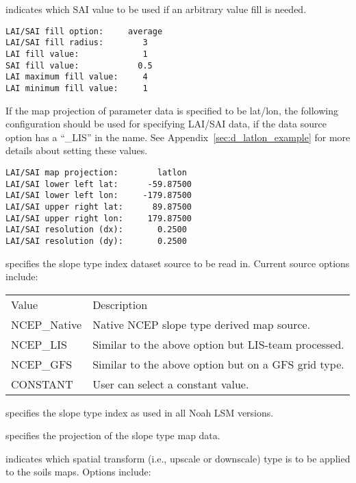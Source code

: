   indicates which SAI
 value to be used if an arbitrary value fill is needed. 
 \nextpar
 

 \begin{Verbatim}[frame=single]
LAI/SAI fill option:     average
LAI/SAI fill radius:        3 
LAI fill value:             1
SAI fill value:            0.5
LAI maximum fill value:     4
LAI minimum fill value:     1
 \end{Verbatim}

 
 If the map projection of parameter data is specified to be lat/lon, 
 the following configuration should be used for specifying LAI/SAI data,
 if  the data source option has a ``\_LIS'' in the name.
 See Appendix~\ref{sec:d_latlon_example} for more details about
 setting these values.
 

 \begin{Verbatim}[frame=single]
LAI/SAI map projection:        latlon
LAI/SAI lower left lat:      -59.87500
LAI/SAI lower left lon:     -179.87500
LAI/SAI upper right lat:      89.87500
LAI/SAI upper right lon:     179.87500
LAI/SAI resolution (dx):       0.2500
LAI/SAI resolution (dy):       0.2500
 \end{Verbatim}


 
  specifies the slope type index 
 dataset source to be read in. Current source options include:

 \begin{tabular}{ll}
 Value       & Description    \\
 NCEP\_Native  &  Native NCEP slope type derived map source. \\
 NCEP\_LIS     &  Similar to the above option but LIS-team processed. \\
 NCEP\_GFS     &  Similar to the above option but on a GFS grid type. \\
 CONSTANT      &  User can select a constant value.  \\
 \end{tabular}

  specifies the slope type index as used in
 all Noah LSM versions.

  specifies the projection of the
 slope type map data.

  indicates which spatial transform
 (i.e., upscale or downscale) type is to be applied to the soils
 maps.  Options include:

